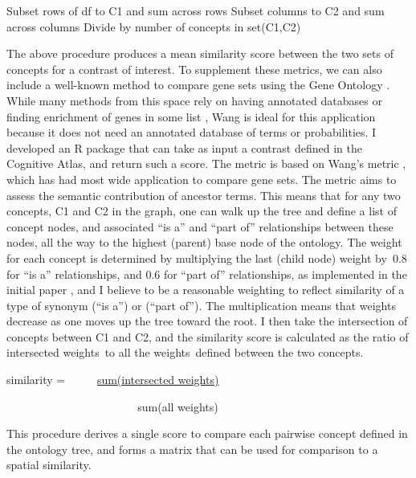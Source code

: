 \documentclass{report}
\begin{document}
\indent Subset rows of df to C1 and sum across rows \newline
\indent \indent Subset columns to C2 and sum across columns \newline
\indent \indent \indent Divide by number of concepts in set(C1,C2) \newline

The above procedure produces a mean similarity score between the two sets of concepts for a contrast of interest. To supplement these metrics, we can also include a well-known method to compare gene sets using the Gene Ontology \cite{Wang2007-nt}. While many methods from this space rely on having annotated databases \cite{Mistry2008} or finding enrichment of genes in some list \cite{Eden2009}, Wang is ideal for this application because it does not need an annotated database of terms or probabilities. I developed an R
package \cite{CognitiveAtlas_undated-hk}
that can take as input a contrast defined in the Cognitive Atlas, and return
such a score. The metric is based on Wang's metric \cite{Wang2007-nt},
which has had most wide application to compare gene sets. The metric
aims to assess the semantic contribution of ancestor terms. This means
that for any two concepts, C1 and C2 in the graph, one can walk up the
tree and define a list of concept nodes, and associated ``is a'' and
``part of'' relationships between these nodes, all the way to the
highest (parent) base node of the ontology. The weight for each concept
is determined by multiplying the last (child node) weight by~0.8 for
``is a'' relationships, and 0.6 for ``part of'' relationships, as
implemented in the initial paper
\cite{Wang2007-nt}, and I believe to be a reasonable weighting to reflect similarity of a
type of synonym (``is a'') or (``part of''). The multiplication means
that weights decrease as one moves up the tree toward the root. I then
take the intersection of concepts between C1 and C2, and the similarity
score is calculated as the ratio of intersected weights~to all the
weights~defined between the two concepts. \newline

similarity = ~ ~ ~ \underline{sum(intersected weights)}

~ ~ ~ ~ ~ ~ ~ ~ ~ ~ ~ ~ ~ ~ sum(all weights)\newline \newline

This procedure derives a single score to compare each pairwise concept
defined in the ontology tree, and forms a matrix that can be used for
comparison to a spatial similarity.
\end{document}

